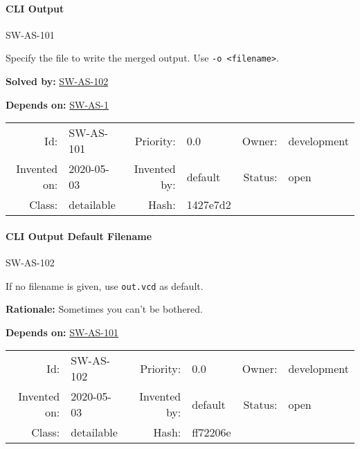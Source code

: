 \paragraph{CLI Output}

\hypertarget{SW-AS-101}{SW-AS-101} 
\label{SW-AS-101}

Specify the file to write the merged output. Use \texttt{-o <filename>}.





 \textbf{Solved by:}
 \hyperlink{SW-AS-102}{SW-AS-102} 


 \textbf{Depends on:}
 \hyperlink{SW-AS-1}{SW-AS-1} 




\par{\small \begin{center}
\begin{tabular}{rlrlrl}
   Id: & SW-AS-101               & Priority: & 0.0          & Owner: & development \\
   Invented on: & 2020-05-03 & Invented by: & default & Status: & open \\
   Class: & detailable & Hash: & 1427e7d2
\end{tabular}\end{center}
}

\paragraph{CLI Output Default Filename}

\hypertarget{SW-AS-102}{SW-AS-102} 
\label{SW-AS-102}

If no filename is given, use \texttt{out.vcd} as default.


\textbf{Rationale:} Sometimes you can’t be bothered.






 \textbf{Depends on:}
 \hyperlink{SW-AS-101}{SW-AS-101} 




\par{\small \begin{center}
\begin{tabular}{rlrlrl}
   Id: & SW-AS-102               & Priority: & 0.0          & Owner: & development \\
   Invented on: & 2020-05-03 & Invented by: & default & Status: & open \\
   Class: & detailable & Hash: & ff72206e
\end{tabular}\end{center}
}

